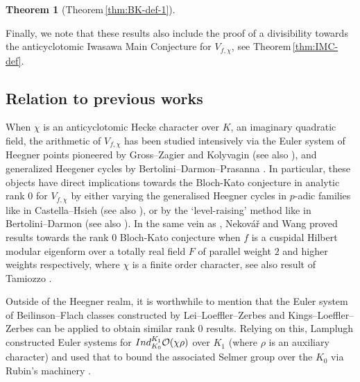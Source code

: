 \documentclass[10pt,letterpaper]{amsart}
\theoremstyle{plain}
\newtheorem{thm}{Theorem}[subsection] %
\theoremstyle{definition}
\theoremstyle{definition}
\theoremstyle{plain}
\theoremstyle{plain}
\theoremstyle{plain}
\theoremstyle{remark}
\numberwithin{equation}{section}
\begin{document}
{\begin{thm}[Theorem\,\ref{thm:BK-def-1}]
\end{thm}


Finally, we note that these results also include the proof of a divisibility towards the anticyclotomic Iwasawa Main Conjecture for $V_{f,\chi}$, see Theorem\,\ref{thm:IMC-def}.


\subsection{Relation to previous works}\label{subsec:previous}

When $\chi$ is an anticyclotomic Hecke character over $K$, an imaginary quadratic field, the arithmetic of $V_{f,\chi}$ has been studied intensively via the Euler system of Heegner points pioneered by Gross--Zagier and Kolyvagin \cite{GZ,kol88} (see also \cite{zhang130,Tian-PhD,nekovar-CM}), and generalized Heegener cycles by Bertolini--Darmon--Prasanna \cite{bdp1}. In particular, these objects have direct implications towards the Bloch-Kato conjecture in analytic rank $0$ for $V_{f,\chi}$  by either varying the generalised Heegner cycles in $p$-adic families like in Castella--Hsieh \cite{cas-hsieh1} (see also \cite{cas-2var}), or by the `level-raising' method like in Bertolini--Darmon \cite{bdIMC} (see also \cite{LV-JNT,ChHs2,Chi}). 
In the same vein as \cite{bdIMC}, Nekov{\'a}{\v{r}} \cite{Neko_2012} and Wang \cite{Wang-anticycltomicHilbert} proved results towards the rank $0$ Bloch-Kato conjecture when $f$ is a cuspidal Hilbert modular eigenform over a totally real field $F$ of parallel weight $2$ and higher weights respectively, where $\chi$ is a finite order character, see also result of Tamiozzo \cite{Tamiozzo2021}. 

Outside of the Heegner realm, it is worthwhile to mention that the Euler system of Beilinson--Flach classes  constructed by Lei--Loeffler--Zerbes \cite{LLZ,LLZ-K} and Kings--Loeffler--Zerbes \cite{KLZ,KLZ-AJM} can be applied to obtain similar rank $0$ results. Relying on this, Lamplugh \cite{JackLamplugh} constructed Euler systems for ${\rm Ind}_{K_0}^{K_1}\mathcal{O}(\chi\rho)$ over $K_1$ (where $\rho$ is an auxiliary character) and used that to bound the associated Selmer group over the $K_0$ via Rubin's machinery \cite{Rubin-ES}.


}
\end{document}
